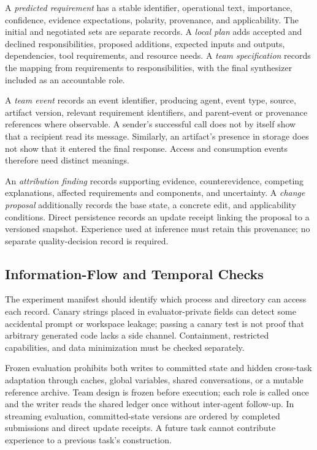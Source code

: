 A \emph{predicted requirement} has a stable identifier, operational text, importance, confidence, evidence expectations, polarity, provenance, and applicability. The initial and negotiated sets are separate records. A \emph{local plan} adds accepted and declined responsibilities, proposed additions, expected inputs and outputs, dependencies, tool requirements, and resource needs. A \emph{team specification} records the mapping from requirements to responsibilities, with the final synthesizer included as an accountable role.

A \emph{team event} records an event identifier, producing agent, event type, source, artifact version, relevant requirement identifiers, and parent-event or provenance references where observable. A sender's successful call does not by itself show that a recipient read its message. Similarly, an artifact's presence in storage does not show that it entered the final response. Access and consumption events therefore need distinct meanings.

An \emph{attribution finding} records supporting evidence, counterevidence, competing explanations, affected requirements and components, and uncertainty. A \emph{change proposal} additionally records the base state, a concrete edit, and applicability conditions. Direct persistence records an update receipt linking the proposal to a versioned snapshot. Experience used at inference must retain this provenance; no separate quality-decision record is required.

\subsection{Information-Flow and Temporal Checks}

The experiment manifest should identify which process and directory can access each record. Canary strings placed in evaluator-private fields can detect some accidental prompt or workspace leakage; passing a canary test is not proof that arbitrary generated code lacks a side channel. Containment, restricted capabilities, and data minimization must be checked separately.

Frozen evaluation prohibits both writes to committed state and hidden cross-task adaptation through caches, global variables, shared conversations, or a mutable reference archive. Team design is frozen before execution; each role is called once and the writer reads the shared ledger once without inter-agent follow-up. In streaming evaluation, committed-state versions are ordered by completed submissions and direct update receipts. A future task cannot contribute experience to a previous task's construction.

